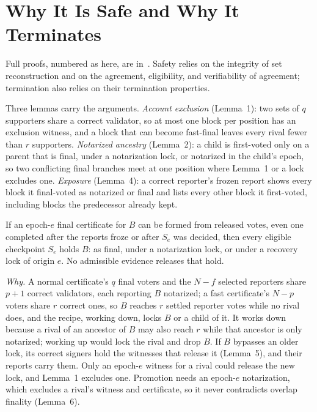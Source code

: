 \section{Why It Is Safe and Why It Terminates}
\label{sec:correctness}
Full proofs, numbered as here, are in~\cite{extended}. Safety relies on the integrity of set reconstruction and on the agreement, eligibility, and verifiability of agreement; termination also relies on their termination properties.

Three lemmas carry the arguments. \emph{Account exclusion} (Lemma~1): two sets of $q$ supporters share a correct validator, so at most one block per position has an exclusion witness, and a block that can become fast-final leaves every rival fewer than $r$ supporters. \emph{Notarized ancestry} (Lemma~2): a child is first-voted only on a parent that is final, under a notarization lock, or notarized in the child's epoch, so two conflicting final branches meet at one position where Lemma~1 or a lock excludes one. \emph{Exposure} (Lemma~4): a correct reporter's frozen report shows every block it final-voted as notarized or final and lists every other block it first-voted, including blocks the predecessor already kept.

\begin{theorem}
\label{thm:closure}
If an epoch-$e$ final certificate for $B$ can be formed from released votes, even one completed after the reports froze or after $S_e$ was decided, then every eligible checkpoint $S_e$ holds $B$: as final, under a notarization lock, or under a recovery lock of origin $e$. No admissible evidence releases that hold.
\end{theorem}
\emph{Why.} A normal certificate's $q$ final voters and the $N-f$ selected reporters share $p+1$ correct validators, each reporting $B$ notarized; a fast certificate's $N-p$ voters share $r$ correct ones, so $B$ reaches $r$ settled reporter votes while no rival does, and the recipe, working down, locks $B$ or a child of it. It works down because a rival of an ancestor of $B$ may also reach $r$ while that ancestor is only notarized; working up would lock the rival and drop $B$. If $B$ bypasses an older lock, its correct signers hold the witnesses that release it (Lemma~5), and their reports carry them. Only an epoch-$e$ witness for a rival could release the new lock, and Lemma~1 excludes one. Promotion needs an epoch-$e$ notarization, which excludes a rival's witness and certificate, so it never contradicts overlap finality (Lemma~6).

